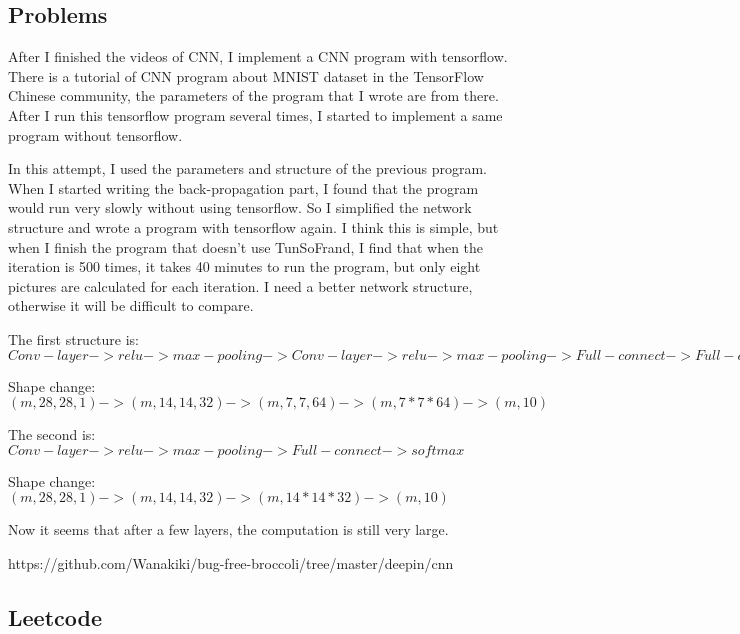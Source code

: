 \documentclass[10pt]{article}
\begin{document}
    \subsection*{Problems}
        After I finished the videos of CNN, I implement a CNN program with tensorflow. There is a tutorial of CNN program about MNIST dataset in the TensorFlow Chinese community, the parameters of the program that I wrote are from there. After I run this tensorflow program several times, I started to implement a same program without tensorflow. \vspace{2ex}
        
        \noindent
        In this attempt, I used the parameters and structure of the previous program. When I started writing the back-propagation part, I found that the program would run very slowly without using tensorflow. So I simplified the network structure and wrote a program with tensorflow again. I think this is simple, but when I finish the program that doesn't use TunSoFrand, I find that when the iteration is 500 times, it takes 40 minutes to run the program, but only eight pictures are calculated for each iteration. I need a better network structure, otherwise it will be difficult to compare.

        The first structure is: $Conv-layer -> relu -> max-pooling -> Conv-layer -> relu -> max-pooling -> Full-connect -> Full-connect ->softmax$

        Shape change:$(m, 28, 28, 1) -> (m, 14, 14, 32) -> (m, 7, 7, 64) -> (m, 7*7*64) -> (m, 10)$\vspace{2ex}

        The second is: $Conv-layer -> relu -> max-pooling -> Full-connect -> softmax$

        Shape change:$(m, 28, 28, 1) -> (m, 14, 14, 32) -> (m, 14*14*32) -> (m, 10)$\vspace{2ex}
        
        \noindent
        Now it seems that after a few layers, the computation is still very large.\vspace{2ex}


        \noindent
        https://github.com/Wanakiki/bug-free-broccoli/tree/master/deepin/cnn
    
    \newpage
    \begin{center}
        \section*{Leetcode}
    \end{center}
\end{document}
